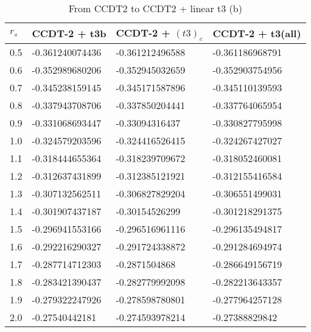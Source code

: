 \begin{table}[h]
\caption{From CCDT2 to CCDT2 + linear t3 (b)}
\begin{center}
\begin{threeparttable}
\begin{tabular}{l l l l}
    \toprule
$r_s$ & CCDT-2 + t3b & CCDT-2 + $(t3)_c$ & CCDT-2 + t3(all)  \\ \hline
0.5 & -0.361240074436 & -0.361212496588 & -0.361186968791   \\
0.6 & -0.352989680206 & -0.352945032659 & -0.352903754956   \\
0.7 & -0.345238159145 & -0.345171587896 & -0.345110139593   \\
0.8 & -0.337943708706 & -0.337850204441 & -0.337764065954   \\
0.9 & -0.331068693447 & -0.33094316437 & -0.330827795998   \\
1.0 & -0.324579203596 & -0.324416526415 & -0.324267427027   \\
1.1 & -0.318444655364 & -0.318239709672 & -0.318052460081   \\
1.2 & -0.312637431899 & -0.312385121921 & -0.312155416584   \\
1.3 & -0.307132562511 & -0.306827829204 & -0.306551499031   \\
1.4 & -0.301907437187 & -0.30154526299 & -0.301218291375   \\
1.5 & -0.296941553166 & -0.296516961116 & -0.296135494817   \\
1.6 & -0.292216290327 & -0.291724338872 & -0.291284694974   \\
1.7 & -0.287714712303 & -0.2871504868 & -0.286649156719   \\
1.8 & -0.283421390437 & -0.282779992098 & -0.282213643357   \\
1.9 & -0.279322247926 & -0.278598780801 & -0.277964257128   \\
2.0 & -0.27540442181 & -0.274593978214 & -0.27388829842   \\
\bottomrule
\end{tabular}
\begin{tablenotes}
\end{tablenotes}
\end{threeparttable}
\end{center}
\label{tab:ccd2_to_ccdt3_2}
\end{table}


